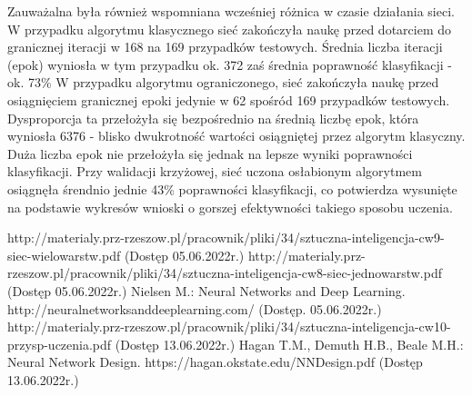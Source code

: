 \documentclass[12pt,twoside]{article}
\begin{document}
Zauważalna była również wspomniana wcześniej różnica w czasie działania sieci.
W przypadku algorytmu klasycznego sieć zakończyła naukę przed dotarciem do granicznej iteracji w 168 na 169 przypadków testowych.
Średnia liczba iteracji (epok) wyniosła w tym przypadku  ok. 372 zaś średnia poprawność klasyfikacji - ok. 73\%
W przypadku algorytmu ograniczonego, sieć zakończyła naukę przed osiągnięciem granicznej epoki jedynie w 62 spośród 169 przypadków testowych.
Dysproporcja ta przełożyła się bezpośrednio na średnią liczbę epok, która wyniosła 6376 - blisko dwukrotność wartości osiągniętej przez algorytm klasyczny.
Duża liczba epok nie przełożyła się jednak na lepsze wyniki poprawności klasyfikacji.
Przy walidacji krzyżowej, sieć uczona osłabionym algorytmem osiągnęła śrendnio  jednie 43\% poprawności klasyfikacji, co potwierdza wysunięte na podstawie wykresów wnioski o gorszej efektywności takiego sposobu uczenia.

\clearpage
{}

\begin{thebibliography}{4}
	 http://materialy.prz-rzeszow.pl/pracownik/pliki/34/sztuczna-inteligencja-cw9-siec-wielowarstw.pdf (Dostęp 05.06.2022r.)
	 http://materialy.prz-rzeszow.pl/pracownik/pliki/34/sztuczna-inteligencja-cw8-siec-jednowarstw.pdf (Dostęp 05.06.2022r.)
	 Nielsen M.: Neural Networks and Deep Learning. http://neuralnetworksanddeeplearning.com/ (Dostęp. 05.06.2022r.)
	 http://materialy.prz-rzeszow.pl/pracownik/pliki/34/sztuczna-inteligencja-cw10-przysp-uczenia.pdf (Dostęp 13.06.2022r.)
	 Hagan T.M., Demuth H.B., Beale M.H.: Neural Network Design. https://hagan.okstate.edu/NNDesign.pdf (Dostęp 13.06.2022r.)
\end{thebibliography}

\clearpage
\end{document}
